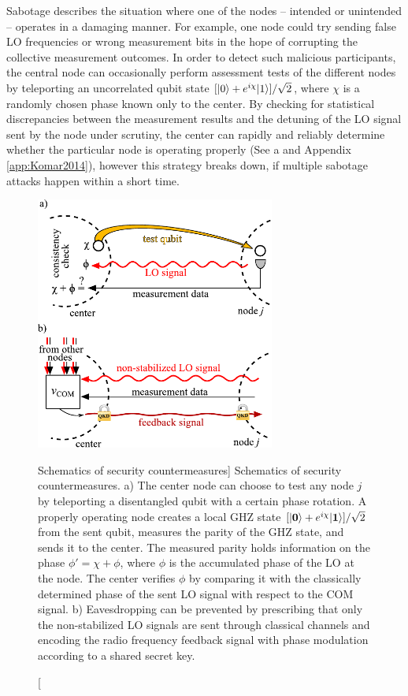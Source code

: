 Sabotage describes the situation where one of the nodes -- intended or
unintended -- operates in a damaging manner. For example, one node
could try sending false LO frequencies or wrong measurement bits in the hope of
corrupting the collective measurement outcomes. In order to detect such
malicious participants, the central node can occasionally perform assessment
tests of the different nodes by teleporting an uncorrelated qubit state
$[| 0 \rangle + e^{i\chi}| 1 \rangle]/\sqrt{2}$, where $\chi$ is a
 randomly chosen phase known only to the center. By checking for statistical
discrepancies between the measurement results and the detuning of the LO signal
sent by the node under scrutiny, the center can rapidly and reliably determine
whether the particular node is operating properly (See a
and Appendix \ref{app:Komar2014}),
however this strategy breaks down, if multiple sabotage attacks
happen within a short time.
\begin{figure}
\centering
\includegraphics[width=0.7\textwidth]{./figs_Komar2014/fig4.pdf}
\caption
[Schematics of security countermeasures]
{
\label{fig:security}
Schematics of security countermeasures.
a) The center node can choose to test any node $j$ by teleporting a disentangled
qubit with a certain phase rotation. A properly operating node creates a local
GHZ state $[| \mathbf{0} \rangle + e^{i\chi}| \mathbf{1} \rangle]/\sqrt{2}$ from the
sent qubit,
 measures the parity of the GHZ state, and sends it to the center. The
measured parity holds information on the phase $\phi' = \chi + \phi$, where
$\phi$ is the accumulated phase of the LO at the node. The center verifies
$\phi$ by comparing it with the classically determined  phase of the sent LO
signal with respect to the COM signal.
b) Eavesdropping can be prevented by prescribing that only the non-stabilized LO
signals are sent through  classical channels and encoding the radio frequency
feedback signal with phase  modulation according to a shared secret key.
}
\end{figure}


